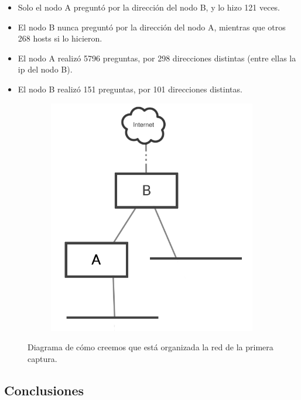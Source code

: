 \begin{itemize}
  \item Solo el nodo A preguntó por la dirección del nodo B, y lo hizo 121 veces.
  \item El nodo B nunca preguntó por la dirección del nodo A, mientras que otros 268 hosts si lo hicieron.
  \item El nodo A realizó 5796 preguntas, por 298 direcciones distintas (entre ellas la ip del nodo B).
  \item El nodo B realizó 151 preguntas, por 101 direcciones distintas.
\end{itemize}

\begin{figure}[h]
  \begin{subfigure}{.5\textwidth}
    \includegraphics[width=\textwidth]{imagenes/laboratorio/red.png}
  \end{subfigure}
  \label{fig:exp1_labo_red}
  \caption{Diagrama de cómo creemos que está organizada la red de la primera captura.}
\end{figure}

\subsection{Conclusiones}

